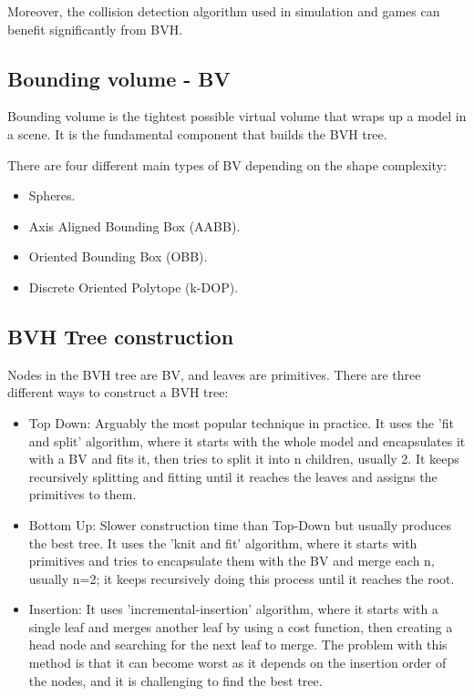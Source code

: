 \documentclass{article}
\begin{document}
	Moreover, the collision detection algorithm used in simulation and games can benefit significantly from BVH.
	
	\subsection{Bounding volume - BV}
	Bounding volume is the tightest possible virtual volume that wraps up a model in a scene. It is the fundamental component that builds the BVH tree.
	
	There are four different main types of BV depending on the shape complexity:
	
	\begin{itemize}
		\item Spheres.
		\item Axis Aligned Bounding Box (AABB).
		\item Oriented Bounding Box (OBB).
		\item Discrete Oriented Polytope (k-DOP).
	\end{itemize}	
	\subsection{BVH Tree construction}
	Nodes in the BVH tree are BV, and leaves are primitives. 
	There are three different ways to construct a BVH tree:
	\begin{itemize}
		\item Top Down:	Arguably the most popular technique in practice. It uses the 'fit and split' algorithm, where it starts with the whole model and encapsulates it with a BV and fits it, then tries to split it into n children, usually 2. It keeps recursively splitting and fitting until it reaches the leaves and assigns the primitives to them.
		
		\item Bottom Up: Slower construction time than Top-Down but usually produces the best tree. It uses the 'knit and fit' algorithm, where it starts with primitives and tries to encapsulate them with the BV and merge each n, usually n=2; it keeps recursively doing this process until it reaches the root.
		
		
		\item Insertion: It uses 'incremental-insertion' algorithm, where it starts with a single leaf and merges another leaf by using a cost function, then creating a head node and searching for the next leaf to merge. The problem with this method is that it can become worst as it depends on the insertion order of the nodes, and it is challenging to find the best tree.
		
	\end{itemize} 
	
\end{document}
